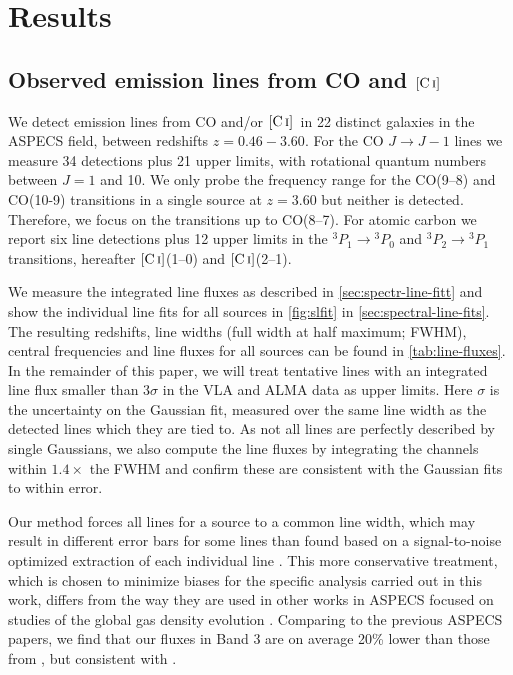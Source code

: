 \documentclass[twocolumn]{aastex62}
\newcommand{\CI}{\ensuremath{\mathrm{[C\, \textsc{i}]}}}
\begin{document}
\section{Results}
\label{sec:results}

\subsection{Observed emission lines from CO and \CI}
\label{sec:observ-emiss-lines}
We detect emission lines from CO and/or \CI\ in 22 distinct galaxies in the
ASPECS field, between redshifts $z=0.46 - 3.60$.  For the CO
$J \rightarrow J-1$ lines we measure 34 detections plus 21 upper limits, with
rotational quantum numbers between $J=1$ and 10.  We only probe the frequency
range for the CO(9--8) and CO(10-9) transitions in a single source at $z=3.60$
but neither is detected.  Therefore, we focus on the transitions up to
CO(8--7).  For atomic carbon we report six line detections plus 12 upper limits
in the $^{3}P_{1} \rightarrow {^{3}P_{0}}$ and
$^{3}P_{2} \rightarrow {^{3}P_{1}}$ transitions, hereafter \CI(1--0) and
\CI(2--1).

We measure the integrated line fluxes as described in
\autoref{sec:spectr-line-fitt} and show the individual line fits for all
sources in \autoref{fig:slfit} in \autoref{sec:spectral-line-fits}.  The
resulting redshifts, line widths (full width at half maximum; FWHM), central
frequencies and line fluxes for all sources can be found in
\autoref{tab:line-fluxes}.  In the remainder of this paper, we will treat
tentative lines with an integrated line flux smaller than $3\sigma$ in the VLA
and ALMA data as upper limits.  Here $\sigma$ is the uncertainty on the
Gaussian fit, measured over the same line width as the detected lines which
they are tied to.  As not all lines are perfectly described by single
Gaussians, we also compute the line fluxes by integrating the channels within
$1.4\times$ the FWHM and confirm these are consistent with the Gaussian fits to
within error.

Our method forces all lines for a source to a common line width, which may
result in different error bars for some lines than found based on a
signal-to-noise optimized extraction of each individual line
\citep{Gonzalez-Lopez2019, Riechers2020b}.  This more conservative treatment,
which is chosen to minimize biases for the specific analysis carried out in
this work, differs from the way they are used in other works in ASPECS focused
on studies of the global gas density evolution \citep{Decarli2019, Decarli2020,
  Riechers2020b}.  Comparing to the previous ASPECS papers, we find that our
fluxes in Band 3 are on average 20\% lower than those from
\cite{Gonzalez-Lopez2019}, but consistent with \citet[][for a small sub-set of
the sources]{Decarli2016b}.
\end{document}
